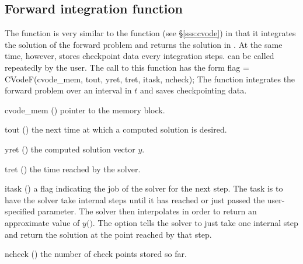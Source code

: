 \subsection{Forward integration function}
\label{sss:cvsolvef}

The function  is very similar to the {\cvodes} function 
(see \S\ref{sss:cvode}) in that it integrates the solution of the forward
problem and returns the solution in . At the same time, however, 
 stores checkpoint data every  integration steps.  
can be called repeatedly by the user.
The call to this function has the form
{
  flag = CVodeF(cvode\_mem, tout, yret, tret, itask, ncheck);
}
{
  The function  integrates the forward problem over an interval in $t$
  and saves checkpointing data.
}
{
  \begin{args}
  \item[cvode\_mem] ()
    pointer to the {\cvodes} memory block.
  \item[tout] ()
    the next time at which a computed solution is desired.
  \item[yret] ()
    the computed solution vector $y$.
  \item[tret] ()
    the time reached by the solver.
  \item[itask] ()
    a flag indicating the job of the solver for the next step. 
    The  task is to have the solver take internal steps until   
    it has reached or just passed the user-specified 
    parameter. The solver then interpolates in order to   
    return an approximate value of $y($$)$. 
    The  option tells the solver to just take one internal step  
    and return the solution at the point reached by that step. 
  \item[ncheck] ()
    the number of check points stored so far.
  \end{args}
}
